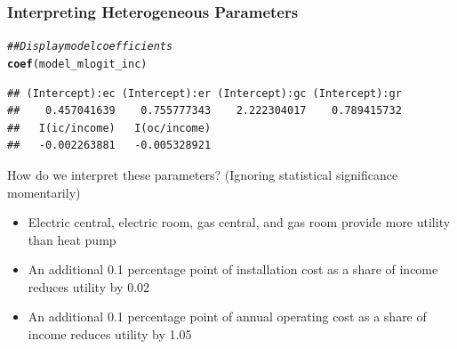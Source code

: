 \documentclass{beamer}\usepackage[]{graphicx}\usepackage[]{color}
\makeatletter
\newcommand{\hlstr}[1]{\textcolor[rgb]{0.192,0.494,0.8}{#1}}%
\newcommand{\hlcom}[1]{\textcolor[rgb]{0.678,0.584,0.686}{\textit{#1}}}%
\newcommand{\hlopt}[1]{\textcolor[rgb]{0,0,0}{#1}}%
\newcommand{\hlstd}[1]{\textcolor[rgb]{0.345,0.345,0.345}{#1}}%
\newcommand{\hlkwc}[1]{\textcolor[rgb]{0.333,0.667,0.333}{#1}}%
\newcommand{\hlkwd}[1]{\textcolor[rgb]{0.737,0.353,0.396}{\textbf{#1}}}%
\newenvironment{kframe}{%
 \def\at@end@of@kframe{}%
 \ifinner\ifhmode%
  \def\at@end@of@kframe{\end{minipage}}%
  \begin{minipage}{\columnwidth}%
 \fi\fi%
 \def\FrameCommand##1{\hskip\@totalleftmargin \hskip-\fboxsep
 \colorbox{shadecolor}{##1}\hskip-\fboxsep
     \hskip-\linewidth \hskip-\@totalleftmargin \hskip\columnwidth}%
 \MakeFramed {\advance\hsize-\width
   \@totalleftmargin\z@ \linewidth\hsize
   \@setminipage}}%
 {\par\unskip\endMakeFramed%
 \at@end@of@kframe}
\newenvironment{knitrout}{}{} %
\makeatother
\begin{document}
\begin{frame}[fragile]\frametitle{Interpreting Heterogeneous Parameters}
\begin{knitrout}\footnotesize
{}\color{fgcolor}\begin{kframe}
\begin{alltt}
\hlcom{## Display model coefficients}
\hlkwd{coef}\hlstd{(model_mlogit_inc)}
\end{alltt}
\begin{verbatim}
## (Intercept):ec (Intercept):er (Intercept):gc (Intercept):gr 
##    0.457041639    0.755777343    2.222304017    0.789415732 
##   I(ic/income)   I(oc/income) 
##   -0.002263881   -0.005328921
\end{verbatim}
\end{kframe}
\end{knitrout}
    \vspace{2ex}
    How do we interpret these parameters? (Ignoring statistical significance momentarily)
    \begin{itemize}
        \item Electric central, electric room, gas central, and gas room provide more utility than heat pump
        \item An additional 0.1 percentage point of installation cost as a share of income reduces utility by 0.02
        \item An additional 0.1 percentage point of annual operating cost as a share of income reduces utility by 1.05
    \end{itemize}
\end{frame}

\end{document}
